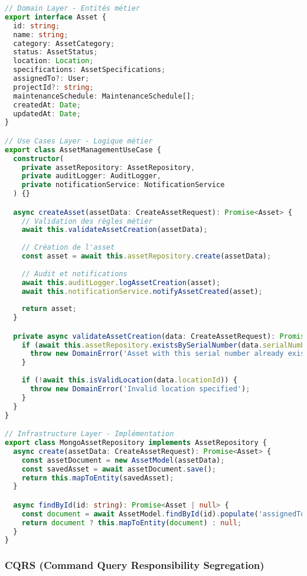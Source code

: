 \documentclass[12pt,a4paper]{report}
\begin{document}
\begin{lstlisting}[language=TypeScript, caption=Structure Clean Architecture]
// Domain Layer - Entités métier
export interface Asset {
  id: string;
  name: string;
  category: AssetCategory;
  status: AssetStatus;
  location: Location;
  specifications: AssetSpecifications;
  assignedTo?: User;
  projectId?: string;
  maintenanceSchedule: MaintenanceSchedule[];
  createdAt: Date;
  updatedAt: Date;
}

// Use Cases Layer - Logique métier
export class AssetManagementUseCase {
  constructor(
    private assetRepository: AssetRepository,
    private auditLogger: AuditLogger,
    private notificationService: NotificationService
  ) {}

  async createAsset(assetData: CreateAssetRequest): Promise<Asset> {
    // Validation des règles métier
    await this.validateAssetCreation(assetData);
    
    // Création de l'asset
    const asset = await this.assetRepository.create(assetData);
    
    // Audit et notifications
    await this.auditLogger.logAssetCreation(asset);
    await this.notificationService.notifyAssetCreated(asset);
    
    return asset;
  }

  private async validateAssetCreation(data: CreateAssetRequest): Promise<void> {
    if (await this.assetRepository.existsBySerialNumber(data.serialNumber)) {
      throw new DomainError('Asset with this serial number already exists');
    }
    
    if (!await this.isValidLocation(data.locationId)) {
      throw new DomainError('Invalid location specified');
    }
  }
}

// Infrastructure Layer - Implémentation
export class MongoAssetRepository implements AssetRepository {
  async create(assetData: CreateAssetRequest): Promise<Asset> {
    const assetDocument = new AssetModel(assetData);
    const savedAsset = await assetDocument.save();
    return this.mapToEntity(savedAsset);
  }

  async findById(id: string): Promise<Asset | null> {
    const document = await AssetModel.findById(id).populate('assignedTo project');
    return document ? this.mapToEntity(document) : null;
  }
}
\end{lstlisting}

\subsubsection{CQRS (Command Query Responsibility Segregation)}
\end{document}
